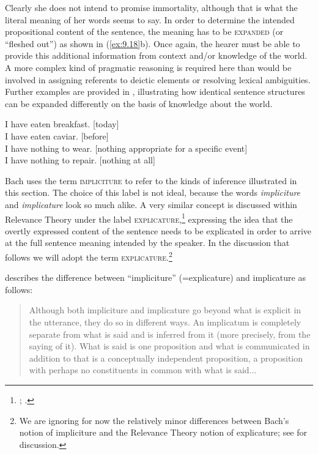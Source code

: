 Clearly she does not intend to promise immortality, although that is what the literal meaning of her words seems to say. In order to determine the intended propositional content of the sentence, the meaning has to be \textsc{expanded} (or “fleshed out”) as shown in (\ref{ex:9.18}b). Once again, the hearer must be able to provide this additional information from context and/or knowledge of the world. A more complex kind of pragmatic reasoning is required here than would be involved in assigning referents to deictic elements or resolving lexical ambiguities. Further examples are provided in , illustrating how identical sentence structures can be expanded differently on the basis of knowledge about the world.


\ea \label{ex:9.18}
\ea I have eaten breakfast. [today]\\
\ex I have eaten caviar. [before]\\
\ex I have nothing to wear. [nothing appropriate for a specific event]\\
\ex I have nothing to repair. [nothing at all]
                       \z
\z


Bach uses the term \textsc{impliciture} to refer to the kinds of inference illustrated in this section. The choice of this label is not ideal, because the words \textit{impliciture} and \textit{implicature} look so much alike. A very similar concept is discussed within Relevance Theory under the label \textsc{explicature},\footnote{\citet{SperberWilson1986}; \citet{Carston1988}.} expressing the idea that the overtly expressed content of the sentence needs to be explicated in order to arrive at the full sentence meaning intended by the speaker. In the discussion that follows we will adopt the term \textsc{explicature}.\footnote{We are ignoring for now the relatively minor differences between Bach’s notion of impliciture and the Relevance Theory notion of explicature; see \citet{Bach2010} for discussion.}



\citet[11]{Bach1994} describes the difference between “impliciture” (=explicature) and implicature as follows:


\begin{quote}
Although both impliciture and implicature go beyond what is explicit in the utterance, they do so in different ways. An implicatum is completely separate from what is said and is inferred from it (more precisely, from the saying of it). What is said is one proposition and what is communicated in addition to that is a conceptually independent proposition, a proposition with perhaps no constituents in common with what is said... 
\end{quote}

